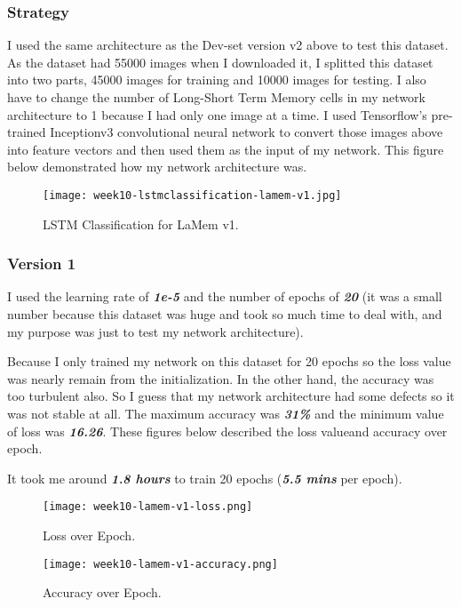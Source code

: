 \subsubsection{Strategy}
I used the same architecture as the Dev-set version v2 above to test this dataset. As the dataset had 55000 images when I downloaded it, I splitted this dataset into two parts, 45000 images for training and 10000 images for testing. I also have to change the number of Long-Short Term Memory cells in my network architecture to 1 because I had only one image at a time. I used Tensorflow's pre-trained Inceptionv3 convolutional neural network to convert those images above into feature vectors and then used them as the input of my network. This figure below demonstrated how my network architecture was.

\newpage
\begin{figure}[!ht]
\centering
\texttt{[image: week10-lstmclassification-lamem-v1.jpg]}
\caption{LSTM Classification for LaMem v1.}
\end{figure}

\subsubsection{Version 1}
I used the learning rate of \textbf{\emph{1e-5}} and the number of epochs of \textbf{\emph{20}} (it was a small number because this dataset was huge and took so much time to deal with, and my purpose was just to test my network architecture).

Because I only trained my network on this dataset for 20 epochs so the loss value was nearly remain from the initialization. In the other hand, the accuracy was too turbulent also. So I guess that my network architecture had some defects so it was not stable at all. The maximum accuracy was \textbf{\emph{31\%}} and the minimum value of loss was \textbf{\emph{16.26}}. These figures below described the loss valueand accuracy over epoch.

It took me around \textbf{\emph{1.8 hours}} to train 20 epochs (\textbf{\emph{5.5 mins}} per epoch).

\begin{figure}[!ht]
\centering
\texttt{[image: week10-lamem-v1-loss.png]}
\caption{Loss over Epoch.}
\end{figure}

\begin{figure}[!ht]
\centering
\texttt{[image: week10-lamem-v1-accuracy.png]}
\caption{Accuracy over Epoch.}
\end{figure}

